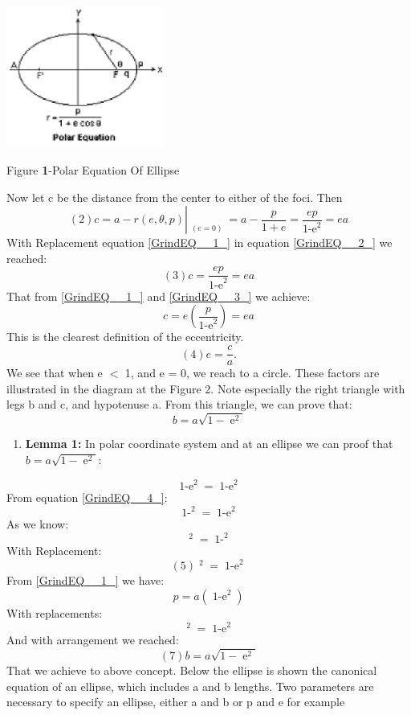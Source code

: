 \documentclass{article}
\begin{document}
\noindent \includegraphics*[width=2.06in, height=1.87in, keepaspectratio=false]{image1.eps}

\noindent Figure \textbf{1}-Polar Equation Of  Ellipse

\noindent Now let c be the distance from the center to either of the foci. Then 
\[                          (2)              c=a-r(e,\theta ,p)\left|\mathop{}\limits_{(e=0)} =\right. a-\frac{p}{1+e} =\frac{ep}{\mathop{1-e}\nolimits^{2} } =ea\] 
With Replacement equation \eqref{GrindEQ__1_} in equation \eqref{GrindEQ__2_} we reached:
\[                          (3)                              c=\frac{ep}{\mathop{1-e}\nolimits^{2} } =ea\] 
That from \eqref{GrindEQ__1_} and \eqref{GrindEQ__3_} we achieve:
\[c=e(\frac{p}{\mathop{1-e}\nolimits^{2} } )=ea\] 
This is the clearest definition of the eccentricity.
\[                                (4)                                 e=\frac{c}{a} .\] 
We see that when e $<$ 1, and e = 0, we reach to a circle. These factors are illustrated in the diagram at the Figure 2. Note especially the right triangle with legs b and c, and hypotenuse a. From this triangle, we can prove that:
\[b=a\sqrt{1-\mathop{e}\nolimits^{2} } \] 

\begin{enumerate}
\item  \textbf{Lemma 1:} In polar coordinate system and at an ellipse we can proof that$b=a\sqrt{1-\mathop{e}\nolimits^{2} } $:
\end{enumerate}

\noindent 
\[\mathop{1-e}\nolimits^{2} =\mathop{1-e}\nolimits^{2} \] 
From equation \eqref{GrindEQ__4_}:
\[\mathop{1-\left(\frac{c}{a} \right)}\nolimits^{2} =\mathop{1-e}\nolimits^{2} \] 
As we know:
\[\mathop{\left(\frac{c}{a} \right)}\nolimits^{2} =\mathop{1-\left(\frac{p}{b} \right)}\nolimits^{2} \] 
With Replacement:
\[                                      (5)                        \mathop{\left(\frac{p}{b} \right)}\nolimits^{2} =\mathop{1-e}\nolimits^{2} \] 
From \eqref{GrindEQ__1_} we have:
\[p=a(\mathop{1-e}\nolimits^{2} )\] 
With replacements:
\[\mathop{\left(\frac{a(\mathop{1-e}\nolimits^{2} )}{b} \right)}\nolimits^{2} =\mathop{1-e}\nolimits^{2} \] 
And with arrangement we reached:
\[                                  (7)                     b=a\sqrt{1-\mathop{e}\nolimits^{2} } \] 
That we achieve to above concept. Below the ellipse is shown the canonical equation of an ellipse, which includes a and b lengths. Two parameters are necessary to specify an ellipse, either a and b or p and e for example
\end{document}
